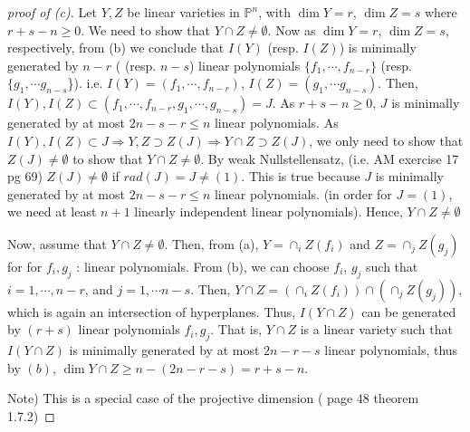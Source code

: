 \documentclass[12pt,letterpaper]{article}
\theoremstyle{definition}
\theoremstyle{remark}
\numberwithin{equation}{section}
\numberwithin{figure}{problem}
\newcommand{\PP}{\mathbb{P}}
\begin{document}
\begin{proof}[proof of (c)] Let $Y,Z$ be linear varieties in $\PP^n$, with $\dim Y = r$, $\dim Z = s$ where $r+s-n \geq 0$. We need to show that $Y \cap Z \neq \emptyset$. Now as $\dim Y = r$, $\dim Z = s$, respectively, from (b) we conclude that $I(Y)$ (resp. $I(Z)$) is minimally generated by $n-r$ ( (resp. $n-s$) linear polynomials $\{f_1, \cdots , f_{n-r}\}$ (resp. $\{g_1, \cdots g_{n-s}$\}). i.e. $I(Y) = (f_1, \cdots, f_{n-r})$, $I(Z) = (g_1, \cdots g_{n-s})$. Then, $I(Y), I(Z) \subset (f_1, \cdots, f_{n-r}, g_1, \cdots, g_{n-s}) = J$. As $r+s-n \geq 0$, $J$ is minimally generated by at most $2n-s-r \leq n$ linear polynomials. As $I(Y), I(Z) \subset J \Rightarrow Y, Z \supset Z(J) \Rightarrow Y \cap Z \supset Z(J)$, we only need to show that $Z(J) \neq \emptyset$ to show that $Y \cap Z \neq \emptyset$. By weak Nullstellensatz, (i.e. AM exercise 17 pg 69) $Z(J) \neq \emptyset$ if $rad(J) = J \neq (1)$. This is true because $J$ is minimally generated by at most $2n-s-r \leq n$ linear polynomials. (in order for $J = (1)$, we need at least $n+1$ linearly independent linear polynomials). Hence, $Y \cap Z \neq \emptyset$

\par Now, assume that $Y \cap Z \neq \emptyset$. Then, from (a), $Y = \cap_i Z(f_i)$ and $Z = \cap_j Z(g_j)$ for for $f_i, g_j$ : linear polynomials. From (b), we can choose $f_i$, $g_j$ such that $i = 1, \cdots, n-r$, and $j = 1, \cdots n-s$. Then, $Y \cap Z = (\cap_i Z(f_i)) \cap (\cap_j Z(g_j))$, which is again an intersection of hyperplanes. Thus, $I(Y\cap Z)$ can be generated by $(r+s)$ linear polynomials $f_i, g_j$. That is, $Y \cap Z$ is a linear variety such that $I(Y\cap Z)$ is minimally generated by at most $2n-r-s$ linear polynomials, thus by $(b)$, $\dim Y\cap Z \geq  n- (2n-r-s) = r+s-n$. 

Note) This is a special case of the projective dimension ( page 48 theorem 1.7.2)

\end{proof}
\end{document}
